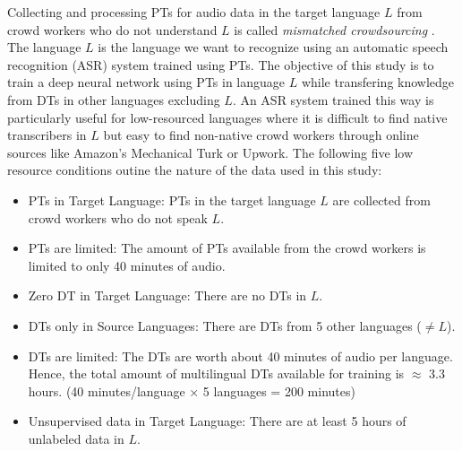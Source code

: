 \documentclass[a4paper]{article}
\begin{document}
Collecting and processing PTs for audio data in the target language $L$ from crowd workers who do not understand $L$ is called \emph{mismatched crowdsourcing} \cite{Jyothi-MismatchedCrowdsourcingTrans}. The language $L$ is the language we want to recognize using an automatic speech recognition (ASR) system trained using PTs. The objective of this study is to train a deep neural network using PTs in language $L$ while transfering knowledge from DTs in other languages excluding $L$.  An ASR system trained this way is particularly useful for low-resourced languages where it is difficult to find native transcribers in $L$ but easy to find non-native crowd workers through online sources like Amazon's Mechanical Turk or Upwork. The following five low resource conditions outine the nature of the data used in this study:  \vspace{-1mm}
\begin{itemize}[leftmargin=*]
\item PTs in Target Language: PTs in the target language $L$ are collected from crowd workers who do not speak $L$. \vspace{-2mm}
\item PTs are limited: The amount of PTs available from the crowd workers is limited to only 40 minutes of audio.  \vspace{-2mm}
\item Zero DT in Target Language: There are no DTs in $L$.  \vspace{-2mm}
\item DTs only in Source Languages: There are DTs from 5 other languages ($\ne L$).  \vspace{-2mm}
\item DTs are limited: The DTs are worth about 40 minutes of audio per language. Hence, the total amount of multilingual DTs available for training is $\approx$ 3.3 hours. (40 minutes/language $\times$ 5 languages = 200 minutes)  \vspace{-1mm}
\item Unsupervised data in Target Language: There are at least 5 hours of unlabeled data in $L$.  \vspace{-1mm}
\end{itemize}
\end{document}
